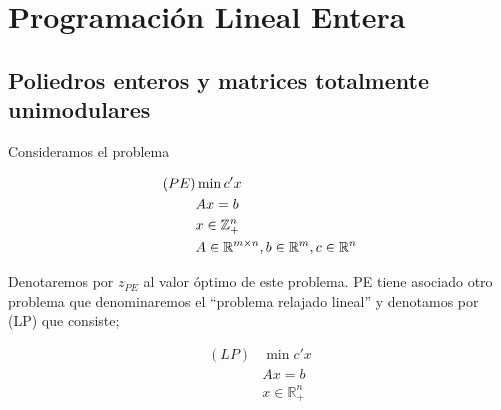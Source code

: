 \documentclass[PM.tex]{subfiles}
\begin{document}
\chapter{Programación Lineal Entera}

\section{Poliedros enteros y matrices totalmente unimodulares}
Consideramos el problema

\begin{align*}
(PE) & \min c'x\\
	 & A x = b\\
	 & x \in \mathbb{Z}_+^n\\
	 & A \in \mathbb{R}^{m \times n}, b \in \mathbb{R}^m, c \in \mathbb{R}^n
\end{align*}

Denotaremos por $z_{PE}$ al valor óptimo de este problema. PE tiene asociado otro problema que denominaremos el ``problema relajado lineal'' y denotamos por (LP) que consiste;

\begin{align*}
(LP) & \min c'x\\
	 & A x = b\\
	 & x \in \mathbb{R}_+^n
\end{align*}
\end{document}
